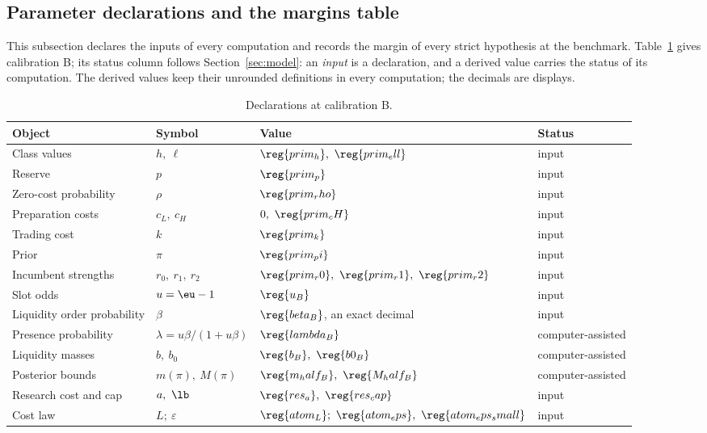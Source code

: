 \subsection{Parameter declarations and the margins table}\label{app:parameters}

This subsection declares the inputs of every computation and records the margin of every strict hypothesis at the
benchmark. Table~\ref{tab:a9-declarations} gives calibration B; its status column follows Section~\ref{sec:model}:
an \emph{input} is a declaration, and a derived value carries the status of its computation. The derived values keep
their unrounded definitions in every computation; the decimals are displays.

\begin{table}[ht]
\centering
\caption{Declarations at calibration B.}\label{tab:a9-declarations}
\footnotesize
\begin{tabular}{@{}llll@{}}
\toprule
Object & Symbol & Value & Status\\
\midrule
Class values & \(h,\ \ell\) & \(\reg{prim_h},\ \reg{prim_ell}\) & input\\
Reserve & \(p\) & \(\reg{prim_p}\) & input\\
Zero-cost probability & \(\rho\) & \(\reg{prim_rho}\) & input\\
Preparation costs & \(c_L,\ c_H\) & \(0,\ \reg{prim_cH}\) & input\\
Trading cost & \(k\) & \(\reg{prim_k}\) & input\\
Prior & \(\pi\) & \(\reg{prim_pi}\) & input\\
Incumbent strengths & \(r_0,\ r_1,\ r_2\) & \(\reg{prim_r0},\ \reg{prim_r1},\ \reg{prim_r2}\) & input\\
Slot odds & \(u=\eu-1\) & \(\reg{u_B}\) & input\\
Liquidity order probability & \(\beta\) & \(\reg{beta_B}\), an exact decimal & input\\
Presence probability & \(\lambda=u\beta/(1+u\beta)\) & \(\reg{lambda_B}\) & computer-assisted\\
Liquidity masses & \(b,\ b_0\) & \(\reg{b_B},\ \reg{b0_B}\) & computer-assisted\\
Posterior bounds & \(m(\pi),\ M(\pi)\) & \(\reg{m_half_B},\ \reg{M_half_B}\) & computer-assisted\\
\midrule
Research cost and cap & \(a,\ \lb\) & \(\reg{res_a},\ \reg{res_cap}\) & input\\
Cost law & \(L;\ \varepsilon\) & \(\reg{atom_L};\ \reg{atom_eps},\ \reg{atom_eps_small}\) & input\\

\end{tabular}
\end{table}
